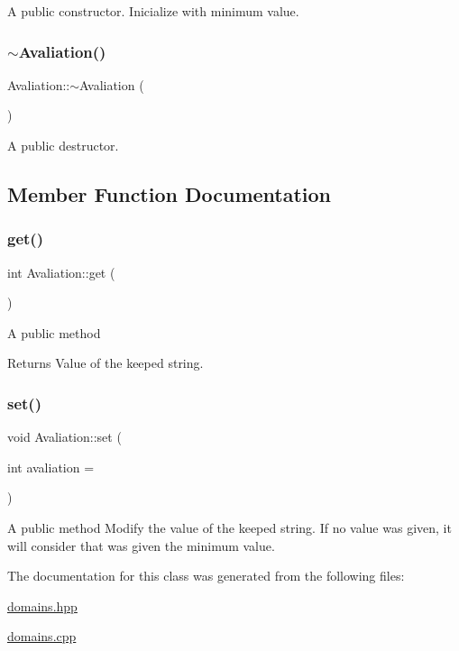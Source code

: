 A public constructor. Inicialize with minimum value. \mbox{\label{class_avaliation_ab9045d4fcf4710c59ce9dac583cd247b}} 
\subsubsection{\texorpdfstring{$\sim$\+Avaliation()}{~Avaliation()}}
{\footnotesize\ttfamily Avaliation\+::$\sim$\+Avaliation (\begin{DoxyParamCaption}{ }\end{DoxyParamCaption})}

A public destructor. 

\subsection{Member Function Documentation}
\mbox{\label{class_avaliation_a49937ea0f69532de8b317737d54e43e6}} 
\subsubsection{\texorpdfstring{get()}{get()}}
{\footnotesize\ttfamily int Avaliation\+::get (\begin{DoxyParamCaption}{ }\end{DoxyParamCaption})}

A public method \begin{DoxyReturn}{Returns}
Value of the keeped string. 
\end{DoxyReturn}
\mbox{\label{class_avaliation_a00b84775eb2dc916d98f9e6cd6678cd3}} 
\subsubsection{\texorpdfstring{set()}{set()}}
{\footnotesize\ttfamily void Avaliation\+::set (\begin{DoxyParamCaption}\item[{int}]{avaliation = {} }\end{DoxyParamCaption})}

A public method Modify the value of the keeped string. If no value was given, it will consider that was given the minimum value. 

The documentation for this class was generated from the following files\+:\begin{DoxyCompactItemize}
\item 
\hyperlink{domains_8hpp}{domains.\+hpp}\item 
\hyperlink{domains_8cpp}{domains.\+cpp}\end{DoxyCompactItemize}
